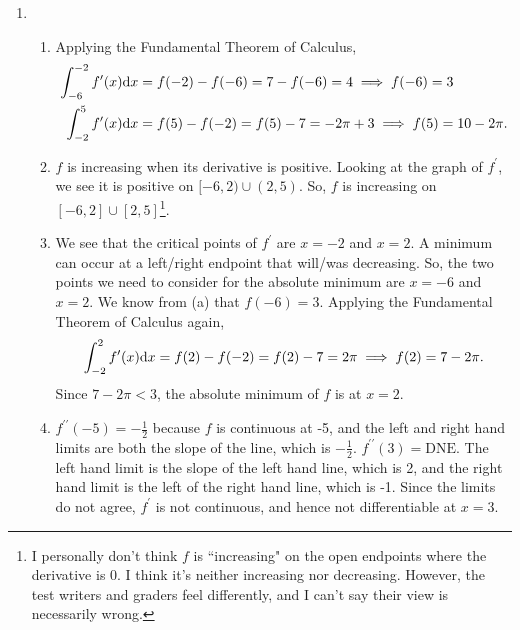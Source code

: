 \begin{enumerate}
	\item \begin{enumerate}
		\item Applying the Fundamental Theorem of Calculus,
			\begin{align*}
				\int_{-6}^{-2}{f^\prime(x)\mathrm{d} x} &= f(-2) - f(-6) = 7 - f(-6) = 4 \implies f(-6) = 3 \\
				\int_{-2}^{5}{f^\prime(x)\mathrm{d} x} &= f(5) - f(-2) = f(5) - 7 = -2\pi + 3 \implies f(5) = 10 - 2\pi.
			\end{align*}
		\item $f$ is increasing when its derivative is positive.
			Looking at the graph of $f^\prime$, we see it is positive on $[-6,2) \cup (2,5)$.
			So, $f$ is increasing on $[-6,2] \cup [2,5]$\footnote{I personally don't think $f$ is ``increasing" on the open endpoints where the derivative is 0. I think it's neither increasing nor decreasing. However, the test writers and graders feel differently, and I can't say their view is necessarily wrong.}.
		\item We see that the critical points of $f^\prime$ are $x=-2$ and $x=2$.
			A minimum can occur at a left/right endpoint that will/was decreasing.
			So, the two points we need to consider for the absolute minimum are $x=-6$ and $x=2$.
			We know from (a) that $f(-6)=3$.
			Applying the Fundamental Theorem of Calculus again,
			\begin{equation*}
				\int_{-2}^{2}{f^\prime(x)\mathrm{d} x} = f(2) - f(-2) = f(2) - 7 = 2\pi \implies f(2) = 7-2\pi.
			\end{equation*}
			Since  $7-2\pi < 3$, the absolute minimum of $f$ is at $x=2$.
		\item $f^{\prime\prime}(-5) = -\frac{1}{2}$ because $f$ is continuous at -5, and the left and right hand limits are both the slope of the line, which is $-\frac{1}{2}$.
			$f^{\prime\prime}(3) = \text{DNE}$.
			The left hand limit is the slope of the left hand line, which is 2, and the right hand limit is the left of the right hand line, which is -1.
			Since the limits do not agree, $f^\prime$ is not continuous, and hence not differentiable at $x=3$.
	\end{enumerate}


\end{enumerate}
